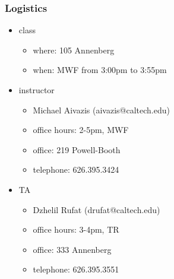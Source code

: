 %
%


\begin{frame}[fragile]
%
  \frametitle{Logistics}
%
  \begin{itemize}
%
  \item class
    \begin{itemize}
    \item where: 105 Annenberg
    \item when: MWF from 3:00pm to 3:55pm
    \end{itemize}
%
  \item instructor
    \begin{itemize}
    \item Michael Aivazis (aivazis@caltech.edu)
    \item office hours: 2-5pm, MWF  
    \item office: 219 Powell-Booth
    \item telephone: 626.395.3424
    \end{itemize}
%
  \item TA
    \begin{itemize}
    \item Dzhelil Rufat (drufat@caltech.edu)
    \item office hours: 3-4pm, TR
    \item office: 333 Annenberg
    \item telephone: 626.395.3551
    \end{itemize}
%
  \end{itemize}
%
\end{frame}

